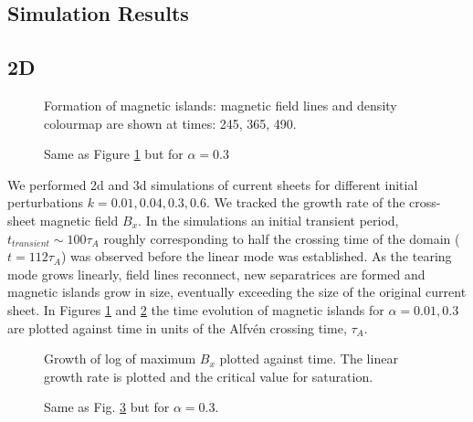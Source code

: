 \documentclass[square]{ws-procs11x85}
\begin{document}
\begin{multicols}{2}
\section{Simulation Results}
\label{Results}
\subsection{2D}
\begin{figure}[H]
\centerline{}
\caption{\label{fig:islforma0.01}
Formation of magnetic islands: magnetic field lines and density colourmap are
shown at times: 245, 365, 490.
 }
 \end{figure}
 \begin{figure}[H]
\centerline{}
 \caption{\label{fig:islforma0.3}
 Same as Figure \ref{fig:islforma0.01} but for $\alpha=0.3$
  }
  \end{figure}
We performed 2d and 3d simulations of current sheets for different initial
perturbations $k=0.01,0.04,0.3,0.6$. We tracked the growth rate of the
cross-sheet magnetic field $B_x$.
In the simulations an initial transient period, $t_{transient}\sim 100 \tau_A$
roughly corresponding to half the crossing time of the domain ($t=112 \tau_A$)
was observed
before the linear mode was established.
As the tearing mode grows linearly, field lines reconnect, new separatrices are
formed and magnetic islands grow in size, eventually exceeding the size of the
original current sheet.
In Figures \ref{fig:islforma0.01} and \ref{fig:islforma0.3} the time evolution
of
magnetic islands for $\alpha=0.01,0.3$ are plotted against time in units of the Alfv\'en crossing time, $\tau_A$.


  \begin{figure}[H] 
\centerline{}
  \caption{\label{fig:2drecoa0.01}
  Growth of log of maximum $B_x$ plotted against time. The linear growth rate is
  plotted and the critical value for saturation.
   }
	\end{figure}
	 \begin{figure}[H]
\centerline{}
	 \caption{\label{fig:2drecoa0.3}
Same as Fig. \ref{fig:2drecoa0.01} but for $\alpha=0.3$.
	  }
	  \end{figure}




\end{multicols}
\end{document}
